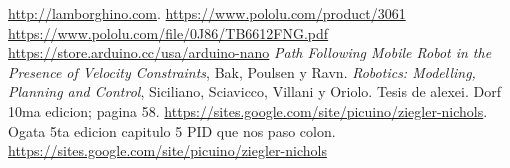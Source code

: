 \documentclass[10pt,conference,a4paper,onecolumn]{article}%
\begin{document}
\begin{thebibliography}{X}
 \url{http://lamborghino.com}. 
\url{https://www.pololu.com/product/3061}
\url{ https://www.pololu.com/file/0J86/TB6612FNG.pdf}
 \url{https://store.arduino.cc/usa/arduino-nano}
 \textit{Path Following Mobile Robot in the Presence of Velocity Constraints}, Bak, Poulsen y Ravn.
 \textit{Robotics: Modelling, Planning and Control}, Siciliano, Sciavicco, Villani y Oriolo.
 Tesis de alexei.
 Dorf 10ma edicion; pagina 58.
 \url{https://sites.google.com/site/picuino/ziegler-nichols}.
 Ogata 5ta edicion capitulo 5
 PID que nos paso colon.
\url{https://sites.google.com/site/picuino/ziegler-nichols}
\end{thebibliography}
\end{document}
